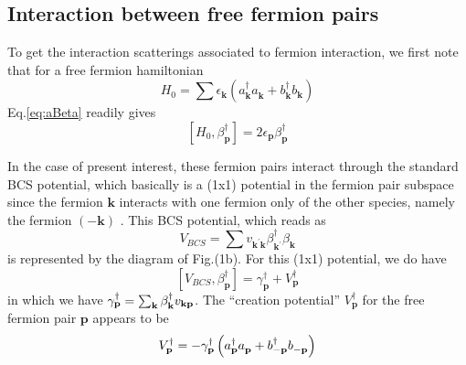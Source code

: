 \documentclass[aps,prb,superscriptaddress,twocolumn]{revtex4}
\newcommand{\vk}{\ensuremath{\mathbf{k}}}
\newcommand{\vp}{\ensuremath{\mathbf{p}}}
\begin{document}
\subsection{Interaction between free fermion pairs}

To get the interaction scatterings associated to fermion interaction, we
first note that for a free fermion hamiltonian 
\begin{equation}  \label{eq:h0}
H_0=\sum{\epsilon_\vk\left(a^{\dagger}_{\mathbf{k} } a^{}_{\mathbf{k}
}+b^{\dagger}_{\mathbf{k} } b^{}_{\mathbf{k} }\right) }
\end{equation}
Eq.\eqref{eq:aBeta} readily gives 
\begin{equation}  \label{eq:betaH}
\left[H_0,\beta^{\dagger}_\vp\right]  =2\epsilon_\vp\beta^{\dagger}_\vp
\end{equation}

In the case of present interest, these fermion pairs interact through the
standard BCS potential, which basically is a (1x1) potential in the fermion pair subspace since the fermion $\mathbf{k}$ 
interacts with one fermion only of the other
species, namely the fermion $\left(-\mathbf{k} \right) $ . This BCS potential, which reads as 
\begin{equation}  \label{eq:vbcs}
V_{BCS}=\sum{v_{\mathbf{k} ^{\prime}\mathbf{k} }\beta^{\dagger}_{\mathbf{k}
^{\prime}}\beta^{}_{\mathbf{k} }}
\end{equation}
 is represented by the diagram of Fig.(1b).
  For this (1x1)
potential, we do have 
\begin{equation}  \label{eq:vbeta}
\left[V_{BCS},\beta^{\dagger}_\vp\right] 
=\gamma^{\dagger}_\vp+V^{\dagger}_\vp
\end{equation}
in which we have $\gamma^{\dagger}_\vp=\sum_\vk\beta^{\dagger}_\vk{}v_{%
\mathbf{k} \mathbf{p} }$. The ``creation potential'' $V^{\dagger}_\vp$ for the free fermion pair 
$\mathbf{p} $ appears to be 
\begin{equation}  \label{eq:betaV}
V^{\dagger}_\vp=-{\gamma^{\dagger}_\vp}\left(a^{\dagger}_{\mathbf{p} }a^{}_{%
\mathbf{p} }+b^{\dagger}_{-\mathbf{p} }b^{}_{-\mathbf{p} }\right) 
\end{equation}
\end{document}
